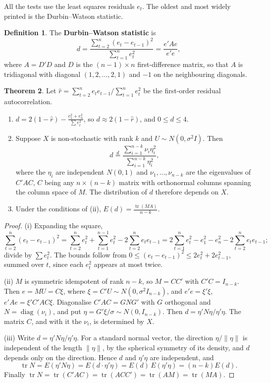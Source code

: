 \documentclass[11pt,a4paper]{article}
\numberwithin{equation}{section}
\DeclareMathOperator{\tr}{tr}
\theoremstyle{definition}
\newtheorem{thm}{Theorem}[subsection]
\newtheorem{defn}[thm]{Definition}
\begin{document}
All the tests use the least squares residuals $e_t$. The oldest and most widely printed is the Durbin--Watson statistic.

\begin{defn}
The \textbf{Durbin--Watson statistic} is
\[
d = \frac{\sum_{t=2}^n(e_t - e_{t-1})^2}{\sum_{t=1}^ne_t^2} = \frac{e'Ae}{e'e},
\]
where $A = D'D$ and $D$ is the $(n - 1) \times n$ first-difference matrix, so that $A$ is tridiagonal with diagonal $(1, 2, \dots, 2, 1)$ and $-1$ on the
neighbouring diagonals.
\end{defn}

\begin{thm}
\label{thm:dw}
Let $\hat r = \sum_{t=2}^ne_te_{t-1}/\sum_{t=1}^ne_t^2$ be the first-order residual autocorrelation.
\begin{enumerate}[label=(\roman*)]
\item $\displaystyle d = 2(1 - \hat r) - \frac{e_1^2 + e_n^2}{\sum e_t^2}$, so $d \approx 2(1 - \hat r)$, and $0 \leq d \leq 4$.
\item Suppose $X$ is non-stochastic with rank $k$ and $U \sim N(0, \sigma^2I)$. Then
\[
d \overset{d}{=} \frac{\sum_{i=1}^{n-k}\nu_i\eta_i^2}{\sum_{i=1}^{n-k}\eta_i^2},
\]
where the $\eta_i$ are independent $N(0, 1)$ and $\nu_1, \dots, \nu_{n-k}$ are the eigenvalues of $C'AC$, $C$ being any $n \times (n - k)$ matrix with orthonormal
columns spanning the column space of $M$. The distribution of $d$ therefore depends on $X$.
\item Under the conditions of (ii), $\displaystyle E(d) = \frac{\tr(MA)}{n - k}$.
\end{enumerate}
\end{thm}

\begin{proof}
(i) Expanding the square,
\[
\sum_{t=2}^n(e_t - e_{t-1})^2 = \sum_{t=2}^ne_t^2 + \sum_{t=1}^{n-1}e_t^2 - 2\sum_{t=2}^ne_te_{t-1} = 2\sum_{t=1}^ne_t^2 - e_1^2 - e_n^2 - 2\sum_{t=2}^ne_te_{t-1} ;
\]
divide by $\sum e_t^2$. The bounds follow from $0 \leq (e_t - e_{t-1})^2 \leq 2e_t^2 + 2e_{t-1}^2$, summed over $t$, since each $e_t^2$ appears at most twice.

(ii) $M$ is symmetric idempotent of rank $n - k$, so $M = CC'$ with $C'C = I_{n-k}$. Then $e = MU = C\xi$, where $\xi = C'U \sim N(0, \sigma^2I_{n-k})$, and
$e'e = \xi'\xi$, $e'Ae = \xi'C'AC\xi$. Diagonalise $C'AC = GNG'$ with $G$ orthogonal and $N = \operatorname{diag}(\nu_i)$, and put $\eta = G'\xi/\sigma \sim N(0, I_{n-k})$.
Then $d = \eta'N\eta/\eta'\eta$. The matrix $C$, and with it the $\nu_i$, is determined by $X$.

(iii) Write $d = \eta'N\eta/\eta'\eta$. For a standard normal vector, the direction $\eta/\|\eta\|$ is independent of the length $\|\eta\|$, by the spherical
symmetry of its density, and $d$ depends only on the direction. Hence $d$ and $\eta'\eta$ are independent, and
\[
\tr N = E(\eta'N\eta) = E(d\cdot\eta'\eta) = E(d)\,E(\eta'\eta) = (n - k)E(d) .
\]
Finally $\tr N = \tr(C'AC) = \tr(ACC') = \tr(AM) = \tr(MA)$.
\end{proof}
\end{document}
